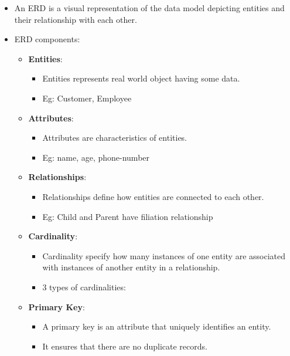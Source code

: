 \begin{flushleft}
	
	\begin{itemize}
		\item An ERD is a visual representation of the data model depicting entities and their relationship with each other.
		
		\item ERD components:
		
		\begin{itemize}
			\item \textbf{Entities}: 
			\begin{itemize}
				\item Entities represents real world object having some data.
				\item Eg: Customer, Employee
			\end{itemize}
			
			
			\item \textbf{Attributes}: 
			\begin{itemize}
				\item Attributes are characteristics of entities.
				\item Eg: name, age, phone-number
			\end{itemize}
			
			
			\item \textbf{Relationships}: 
			\begin{itemize}
				\item Relationships define how entities are connected to each other.
				\item Eg: Child and Parent have filiation relationship
			\end{itemize}
			
			\newpage
			
			
			\item \textbf{Cardinality}: 
			\begin{itemize}
				\item Cardinality specify how many instances of one entity are associated with instances of another entity in a relationship. 
				\item 3 types of cardinalities:
			\end{itemize}
			
			\newpage
			\item \textbf{Primary Key}: 
			\begin{itemize}
				\item A primary key is an attribute that uniquely identifies an entity. 
				\item It ensures that there are no duplicate records.
			\end{itemize}
			

\end{itemize}
\end{itemize}
\end{flushleft}
